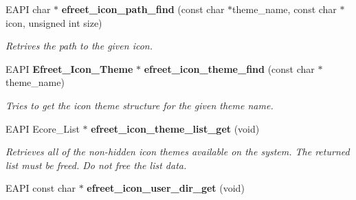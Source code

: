\begin{CompactItemize}
EAPI char $\ast$ {\bf efreet\_\-icon\_\-path\_\-find} (const char $\ast$theme\_\-name, const char $\ast$icon, unsigned int size)
\begin{CompactList}\small\item\em Retrives the path to the given icon. \item\end{CompactList}\item 
EAPI {\bf Efreet\_\-Icon\_\-Theme} $\ast$ {\bf efreet\_\-icon\_\-theme\_\-find} (const char $\ast$theme\_\-name)
\begin{CompactList}\small\item\em Tries to get the icon theme structure for the given theme name. \item\end{CompactList}\item 
EAPI Ecore\_\-List $\ast$ {\bf efreet\_\-icon\_\-theme\_\-list\_\-get} (void)
\begin{CompactList}\small\item\em Retrieves all of the non-hidden icon themes available on the system. The returned list must be freed. Do not free the list data. \item\end{CompactList}\item 
EAPI const char $\ast$ {\bf efreet\_\-icon\_\-user\_\-dir\_\-get} (void)
\end{CompactItemize}
